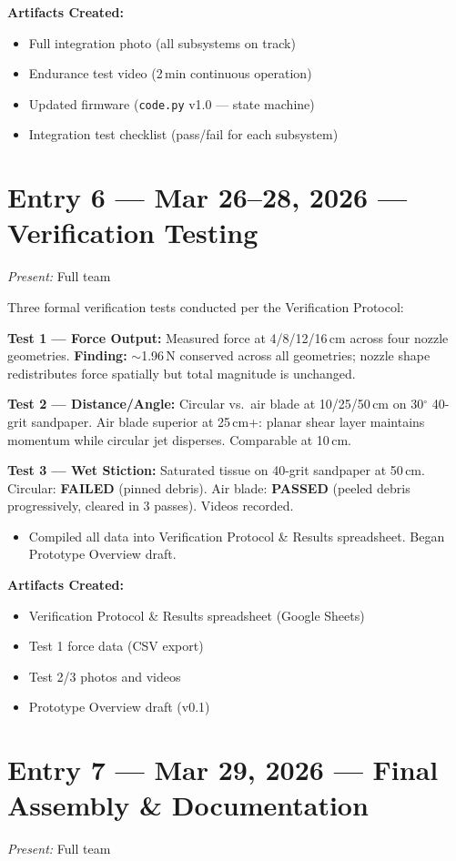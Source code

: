 \documentclass[12pt, letterpaper]{article}
\newcommand{\logentry}[2]{%
  \section{#1}%
  \textit{Present:} #2\par\vspace{1pt}%
}
\newcommand{\artifacts}{\par\vspace{1pt}\textbf{Artifacts Created:}\vspace{0pt}}
\begin{document}
\artifacts
\begin{itemize}
  \item Full integration photo (all subsystems on track)
  \item Endurance test video (2\,min continuous operation)
  \item Updated firmware (\texttt{code.py} v1.0 --- state machine)
  \item Integration test checklist (pass/fail for each subsystem)
\end{itemize}

\logentry{Entry 6 \textnormal{---} Mar 26--28, 2026 \textnormal{---} Verification Testing}{Full team}

Three formal verification tests conducted per the Verification Protocol:

\textbf{Test 1 --- Force Output:} Measured force at 4/8/12/16\,cm across four nozzle geometries. \textbf{Finding:} $\sim$1.96\,N conserved across all geometries; nozzle shape redistributes force spatially but total magnitude is unchanged.

\textbf{Test 2 --- Distance/Angle:} Circular vs.\ air blade at 10/25/50\,cm on 30$^\circ$ 40-grit sandpaper. Air blade superior at 25\,cm+: planar shear layer maintains momentum while circular jet disperses. Comparable at 10\,cm.

\textbf{Test 3 --- Wet Stiction:} Saturated tissue on 40-grit sandpaper at 50\,cm. Circular: \textbf{FAILED} (pinned debris). Air blade: \textbf{PASSED} (peeled debris progressively, cleared in 3 passes). Videos recorded.

\begin{itemize}
  \item Compiled all data into Verification Protocol \& Results spreadsheet. Began Prototype Overview draft.
\end{itemize}

\artifacts
\begin{itemize}
  \item Verification Protocol \& Results spreadsheet (Google Sheets)
  \item Test 1 force data (CSV export)
  \item Test 2/3 photos and videos
  \item Prototype Overview draft (v0.1)
\end{itemize}

\logentry{Entry 7 \textnormal{---} Mar 29, 2026 \textnormal{---} Final Assembly \& Documentation}{Full team}
\end{document}
